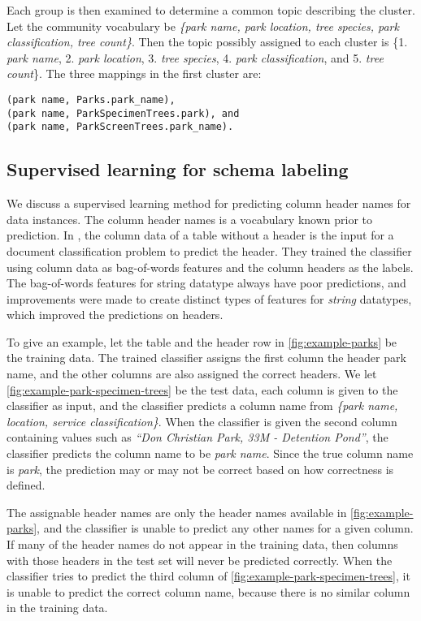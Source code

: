 Each group is then examined to determine a common topic describing the cluster. Let the community vocabulary be \textit{\{park name, park location, tree species, park classification, tree count\}}. Then the topic possibly assigned to each cluster is \{1. \textit{park name}, 2. \textit{park location}, 3. \textit{tree species}, 4. \textit{park classification}, and 5. \textit{tree count}\}. The three mappings in the first cluster are:
\begin{lstlisting}
(park name, Parks.park_name),
(park name, ParkSpecimenTrees.park), and
(park name, ParkScreenTrees.park_name).
\end{lstlisting}

\subsection{Supervised learning for schema labeling}
\label{ssec:SupervisedLearningForSchemaLabeling}

We discuss a supervised learning method for predicting column header names for data instances. The column header names is a vocabulary known prior to prediction. In \cite{10.1145/3184558.3191601}, the column data of a table without a header is the input for a document classification problem to predict the header. They trained the classifier using column data as bag-of-words features and the column headers as the labels. The bag-of-words features for string datatype always have poor predictions, and improvements were made to create distinct types of features for \textit{string} datatypes, which improved the predictions on headers.

To give an example, let the table and the header row in \autoref{fig:example-parks} be the training data. The trained classifier assigns the first column the header park name, and the other columns are also assigned the correct headers. We let \autoref{fig:example-park-specimen-trees} be the test data, each column is given to the classifier as input, and the classifier predicts a column name from \textit{\{park name, location, service classification\}}. When the classifier is given the second column containing values such as \textit{``Don Christian Park, 33M - Detention Pond''}, the classifier predicts the column name to be \textit{park name}. Since the true column name is \textit{park}, the prediction may or may not be correct based on how correctness is defined.

The assignable header names are only the header names available in \autoref{fig:example-parks}, and the classifier is unable to predict any other names for a given column. If many of the header names do not appear in the training data, then columns with those headers in the test set will never be predicted correctly. When the classifier tries to predict the third column of \autoref{fig:example-park-specimen-trees}, it is unable to predict the correct column name, because there is no similar column in the training data.

